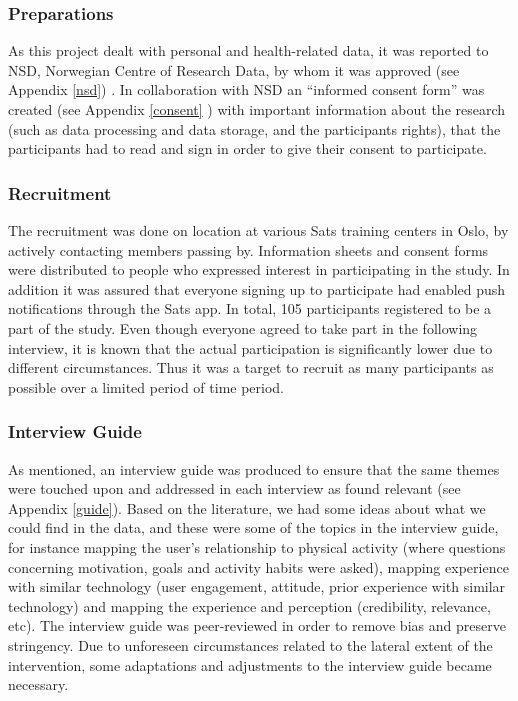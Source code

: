         \subsubsection{Preparations}
        As this project dealt with personal and health-related data, it was reported to NSD, Norwegian Centre of Research Data, by whom it was approved (see Appendix \ref{nsd}) . In collaboration with NSD an “informed consent form” was created (see Appendix \ref{consent} ) with important information about the research (such as data processing and data storage, and the participants rights), that the participants had to read and sign in order to give their consent to participate. 
        
        \subsubsection{Recruitment}
        The recruitment was done on location at various Sats training centers in Oslo, by actively contacting members passing by. Information sheets and consent forms were distributed to people who expressed interest in participating in the study. In addition it was assured that everyone signing up to participate had enabled push notifications through the Sats app. In total, 105 participants registered to be a part of the study. Even though everyone agreed to take part in the following interview, it is known that the actual participation is significantly lower due to different circumstances. Thus it was a target to recruit  as  many participants as possible over a limited period of time period.
        
        
        \subsubsection{Interview Guide}
	    As mentioned, an interview guide was produced to ensure that the same themes were touched upon and addressed in each interview as found relevant (see Appendix \ref{guide}). Based on the literature, we had some ideas about what we could find in the data, and these were some of the topics in the interview guide, for instance mapping the user’s relationship to physical activity (where questions concerning motivation, goals and activity habits were asked), mapping experience with similar technology (user engagement, attitude, prior experience with similar technology) and mapping the experience and perception (credibility, relevance, etc).  The interview guide was peer-reviewed in order to remove bias and preserve stringency. Due to unforeseen circumstances related to the lateral extent of the intervention, some adaptations and adjustments to the interview guide became necessary. 
        
